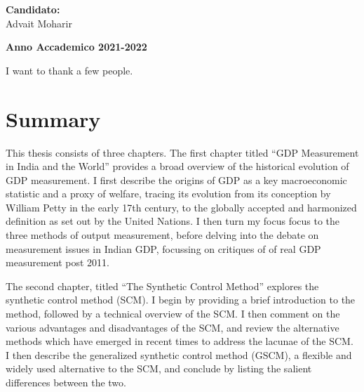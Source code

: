 \documentclass[12pt,nobind, a4paper]{reedthesis}
\begin{document}
	\hfill
	\begin{minipage}[t]{0.47\textwidth}\raggedleft
		{\large{\textbf{Candidato:}\\
				Advait Moharir}}
	\end{minipage}
	\vspace{2mm} %
	\begin{center}
		{\large{\bf Anno Accademico 2021-2022}}
	\end{center}
	\frontmatter %
	\pagestyle{empty} %
		\begin{acknowledgements}
		I want to thank a few people.
	\end{acknowledgements}
		
		\hypersetup{linkcolor=blue}
	\setcounter{secnumdepth}{2}
	\setcounter{tocdepth}{2}
	\tableofcontents
		
		\listoftables
		
		\listoffigures
		
		
		
	\mainmatter %
	\pagestyle{fancyplain} %
	
	\hypertarget{summary}{%
 \chapter*{Summary}\label{summary}}

 This thesis consists of three chapters. The first chapter titled ``GDP Measurement in India and the World'' provides a broad overview of the historical evolution of GDP measurement. I first describe the origins of GDP as a key macroeconomic statistic and a proxy of welfare, tracing its evolution from its conception by William Petty in the early 17th century, to the globally accepted and harmonized definition as set out by the United Nations. I then turn my focus focus to the three methods of output measurement, before delving into the debate on measurement issues in Indian GDP, focussing on critiques of of real GDP measurement post 2011.
 \linebreak

 The second chapter, titled ``The Synthetic Control Method'' explores the synthetic control method (SCM). I begin by providing a brief introduction to the method, followed by a technical overview of the SCM. I then comment on the various advantages and disadvantages of the SCM, and review the alternative methods which have emerged in recent times to address the lacunae of the SCM. I then describe the generalized synthetic control method (GSCM), a flexible and widely used alternative to the SCM, and conclude by listing the salient differences between the two. \linebreak
\end{document}
